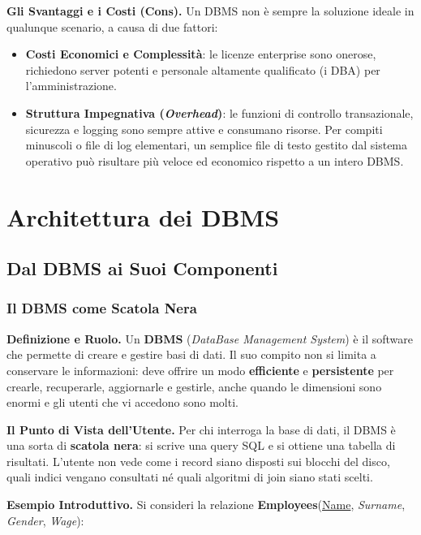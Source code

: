 \documentclass[12pt]{extarticle}
\begin{document}
\medskip
\noindent \textbf{Gli Svantaggi e i Costi (Cons).} Un DBMS non è sempre la soluzione ideale in qualunque scenario, a causa di due fattori:
\begin{itemize}
    \item \textbf{Costi Economici e Complessità}: le licenze enterprise sono onerose, richiedono server potenti e personale altamente qualificato (i DBA) per l'amministrazione.
    \item \textbf{Struttura Impegnativa (\textit{Overhead})}: le funzioni di controllo transazionale, sicurezza e logging sono sempre attive e consumano risorse. Per compiti minuscoli o file di log elementari, un semplice file di testo gestito dal sistema operativo può risultare più veloce ed economico rispetto a un intero DBMS.
\end{itemize}

\newpage

\section{Architettura dei DBMS}

\subsection{Dal DBMS ai Suoi Componenti}
\subsubsection{Il DBMS come Scatola Nera}

\noindent \textbf{Definizione e Ruolo.} Un \textbf{DBMS} (\textit{DataBase Management System}) è il software che permette di creare e gestire basi di dati. Il suo compito non si limita a conservare le informazioni: deve offrire un modo \textbf{efficiente} e \textbf{persistente} per crearle, recuperarle, aggiornarle e gestirle, anche quando le dimensioni sono enormi e gli utenti che vi accedono sono molti.

\medskip
\noindent \textbf{Il Punto di Vista dell'Utente.} Per chi interroga la base di dati, il DBMS è una sorta di \textbf{scatola nera}: si scrive una query SQL e si ottiene una tabella di risultati. L'utente non vede come i record siano disposti sui blocchi del disco, quali indici vengano consultati né quali algoritmi di join siano stati scelti.

\medskip
\noindent \textbf{Esempio Introduttivo.} Si consideri la relazione \textbf{Employees}(\underline{Name}, \textit{Surname}, \textit{Gender}, \textit{Wage}):
\end{document}

